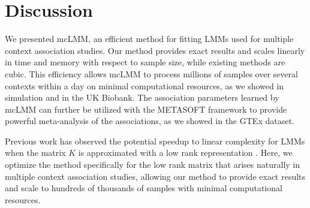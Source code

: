 \section{Discussion}

    We presented mcLMM, an efficient method for fitting LMMs used for multiple context association studies. Our method provides exact results and scales linearly in time and memory with respect to sample size, while existing methods are cubic. This efficiency allows mcLMM to process millions of samples over several contexts within a day on minimal computational resources, as we showed in simulation and in the UK Biobank. The association parameters learned by mcLMM can further be utilized with the METASOFT framework to provide powerful meta-analysis of the associations, as we showed in the GTEx dataset. 
    
    Previous work has observed the potential speedup to linear complexity for LMMs when the matrix $K$ is approximated with a low rank representation \cite{Lippert2011}. Here, we optimize the method specifically for the low rank matrix that arises naturally in multiple context association studies, allowing our method to provide exact results and scale to hundreds of thousands of samples with minimal computational resources.